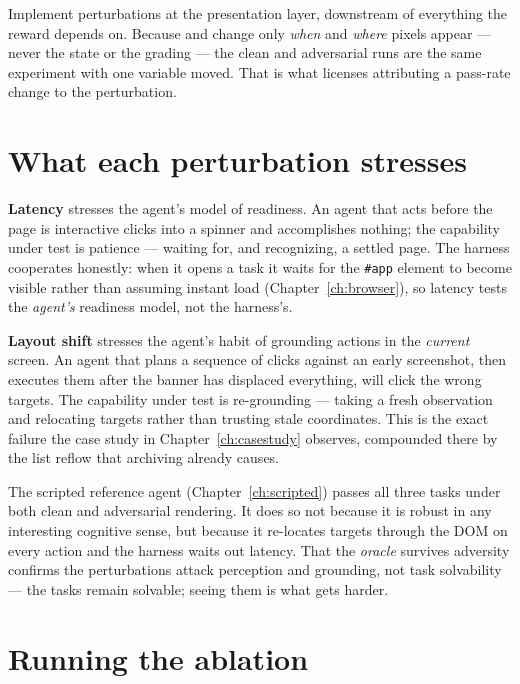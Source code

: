 \documentclass[11pt,openany]{book}
\newcommand{\code}[1]{\textcolor{clayd}{\texttt{\detokenize{#1}}}}
\begin{document}
\begin{principle}[.\ ]
Implement perturbations at the presentation layer, downstream of everything the
reward depends on. Because \code{latency_ms} and \code{layout_shift} change only
\emph{when} and \emph{where} pixels appear — never the state or the grading — the
clean and adversarial runs are the same experiment with one variable moved. That
is what licenses attributing a pass-rate change to the perturbation.
\end{principle}

\section{What each perturbation stresses}

\textbf{Latency} stresses the agent's model of readiness. An agent that acts
before the page is interactive clicks into a spinner and accomplishes nothing;
the capability under test is patience — waiting for, and recognizing, a settled
page. The harness cooperates honestly: when it opens a task it waits for the
\texttt{\textcolor{clayd}{\#app}} element to become visible rather than assuming instant load
(Chapter~\ref{ch:browser}), so latency tests the \emph{agent's} readiness model,
not the harness's.

\textbf{Layout shift} stresses the agent's habit of grounding actions in the
\emph{current} screen. An agent that plans a sequence of clicks against an early
screenshot, then executes them after the banner has displaced everything, will
click the wrong targets. The capability under test is re-grounding — taking a
fresh observation and relocating targets rather than trusting stale coordinates.
This is the exact failure the case study in Chapter~\ref{ch:casestudy} observes,
compounded there by the list reflow that archiving already causes.

\begin{notebox}[.\ ]
The scripted reference agent (Chapter~\ref{ch:scripted}) passes all three tasks
under both clean and adversarial rendering. It does so not because it is robust
in any interesting cognitive sense, but because it re-locates targets through the
DOM on every action and the harness waits out latency. That the \emph{oracle}
survives adversity confirms the perturbations attack perception and grounding,
not task solvability — the tasks remain solvable; seeing them is what gets harder.
\end{notebox}

\section{Running the ablation}
\end{document}

